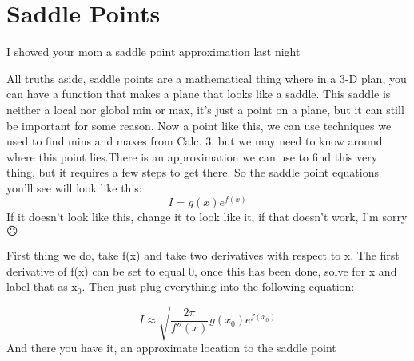 \documentclass[arial]{article}
\begin{document}
\section*{Saddle Points}
I showed your mom a saddle point approximation last night
\vspace{3mm}

All truths aside, saddle points are a mathematical thing where in a 3-D plan, you can have a function that makes a plane that looks like a saddle. This saddle is neither a local nor global min or max, it's just a point on a plane, but it can still be important for some reason. Now a point like this, we can use techniques we used to find mins and maxes from Calc. 3, but we may need to know around where this point lies.There is an approximation we can use to find this very thing, but it requires a few steps to get there. So the saddle point equations you'll see will look like this:
\begin{equation}
I = g(x) e^{f(x)}
\end{equation}
If it doesn't look like this, change it to look like it, if that doesn't work, I'm sorry $\frownie{}$
\vspace{3mm}

First thing we do, take f(x) and take two derivatives with respect to x. The first derivative of f(x) can be set to equal 0, once this has been done, solve for x and label that as x$_0$. Then just plug everything into the following equation:

\begin{equation}
I \approx \sqrt{\frac{2\pi}{f''(x)}} g(x_0) e^{f(x_0)}
\end{equation}
And there you have it, an approximate location to the saddle point
\end{document}
